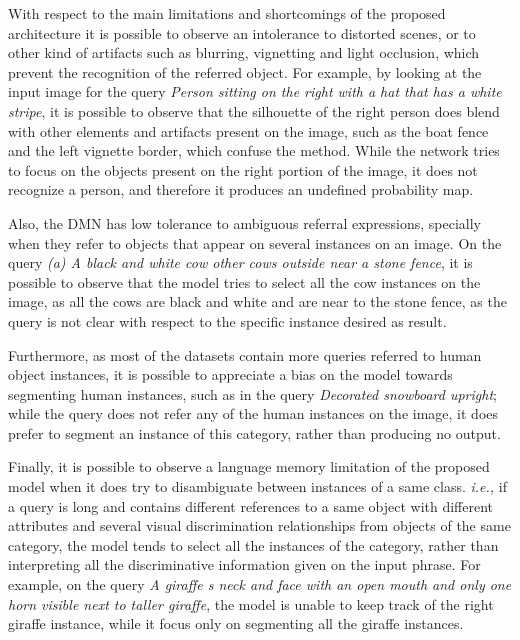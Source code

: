 With respect to the main limitations and shortcomings of the proposed architecture it is possible to observe an intolerance to distorted scenes, or to other kind of artifacts such as blurring, vignetting and light occlusion, which prevent the recognition of the referred object. For example, by looking at the input image for the query \textit{Person sitting on the right with a hat that has a white stripe}, it is possible to observe that the silhouette of the right person does blend with other elements and artifacts present on the image, such as the boat fence and the left vignette border, which confuse the method. While the network tries to focus on the objects present on the right portion of the image, it does not recognize a person, and therefore it produces an undefined probability map. 

Also, the DMN has low tolerance to ambiguous referral expressions, specially when they refer to objects that appear on several instances on an image. On the query \textit{(a)
A black and white cow other cows outside near a stone fence}, it is possible to observe that the model tries to select all the cow instances on the image, as all the cows are black and white and are near to the stone fence, as the query is not clear with respect to the specific instance desired as result.

Furthermore, as most of the datasets contain more queries referred to human object instances, it is possible to appreciate a bias on the model towards segmenting human instances, such as in the query \textit{Decorated snowboard upright}; while the query does not refer any of the human instances on the image, it does prefer to segment an instance of this category, rather than producing no output.

Finally, it is possible to observe a language memory limitation of the proposed model when it does try to disambiguate between instances of a same class. \textit{i.e.,} if a query is long and contains different references to a same object with different attributes and several visual discrimination relationships from objects of the same category, the model tends to select all the instances of the category, rather than interpreting all the discriminative information given on the input phrase. For example, on the query \textit{A giraffe s neck and face with an open mouth and only one horn visible next to taller giraffe}, the model is unable to keep track of the right giraffe instance, while it focus only on segmenting all the giraffe instances.  

